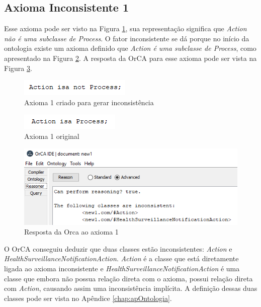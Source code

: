 \documentclass{bcc}
\begin{document}
\subsection{Axioma Inconsistente 1}
Esse axioma pode ser visto na Figura \ref{fig:axiomai_1}, sua representação significa que \textit{Action não é uma subclasse de Process}. O fator inconsistente se dá porque no início da ontologia existe um axioma definido que \textit{Action é uma subclasse de Process}, como apresentado na Figura \ref{fig:axiomai_1_o}. A resposta da OrCA para esse axioma pode ser vista na Figura \ref{fig:axiomai_1_res}.

\begin{figure}[H]
\centering
\includegraphics[width=.3\textwidth]{Figuras/axiomai_1.png}
\caption{Axioma 1 criado para gerar inconsistência} 
\label{fig:axiomai_1}
\end{figure}

\begin{figure}[H]
\centering
\includegraphics[width=.3\textwidth]{Figuras/axiomai_1_o.png}
\caption{Axioma 1 original} 
\label{fig:axiomai_1_o}
\end{figure}

\begin{figure}[H]
\centering
\includegraphics[width=.6\textwidth]{Figuras/axiomai_1_res.png}
\caption{Resposta da Orca ao axioma 1} 
\label{fig:axiomai_1_res}
\end{figure}

O OrCA conseguiu deduzir que duas classes estão inconsistentes: \textit{Action} e \textit{HealthSurveillanceNotificationAction}. \textit{Action} é a classe que está diretamente ligada ao axioma inconsistente e \textit{HealthSurveillanceNotificationAction} é uma classe que embora não possua relação direta com o axioma, possui relação direta com \textit{Action}, causando assim uma inconsistência implícita. A definição dessas duas classes pode ser vista no Apêndice \ref{chap:apOntologia}.
\end{document}
